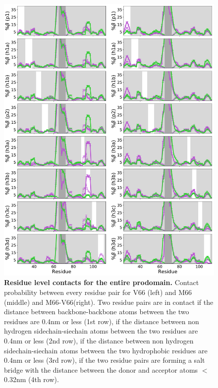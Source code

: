 \documentclass[10pt,letterpaper]{article}
\begin{document}
\begin{figure}[!ht]
\includegraphics[scale=0.5,width=\textwidth,trim={0 0cm 0 0cm},clip]{./figures/S12.pdf}
\caption{{\bf Residue level contacts for the entire prodomain.} Contact probability between every residue pair for V66 (left) and M66 (middle) and M66-V66(right). Two residue pairs are in contact if the distance between backbone-backbone atoms between the two residues are 0.4nm or less (1st row), if the distance between non hydrogen sidechain-siechain atoms between the two residues are 0.4nm or less (2nd row), if the distance between non hydrogen sidechain-siechain atoms between the two hydrophobic residues are 0.4nm or less (3rd row), if the two residue pairs are forming a salt bridge with the distance between the donor and acceptor atoms $<$ 0.32nm (4th row).}
\label{S12} 
\end{figure}


\clearpage


\end{document}

